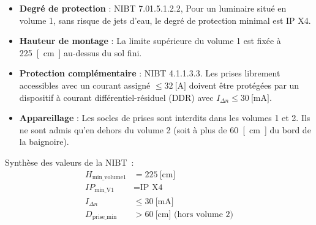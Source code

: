 \documentclass[a4paper,11pt,answers,addpoints]{exam}
\begin{document}
\begin{questions}
\begin{solution}
	\begin{itemize}
		\item \textbf{Degré de protection} : NIBT 7.01.5.1.2.2,  Pour un luminaire situé en volume \num{1}, sans risque de jets d'eau, le degré de protection minimal est IP X4.
		\item \textbf{Hauteur de montage} : La limite supérieure du volume \num{1} est fixée à \qty{225}{[\centi\metre]} au-dessus du sol fini.
		\item \textbf{Protection complémentaire} : NIBT 4.1.1.3.3. Les prises librement accessibles avec un courant assigné $\leq \qty{32}{[\ampere]}$ doivent être protégées par un dispositif à courant différentiel-résiduel (DDR) avec $I_{\Delta n} \leq \qty{30}{[\milli\ampere]}$.
		\item \textbf{Appareillage} : Les socles de prises sont interdits dans les volumes \num{1} et \num{2}. Ils ne sont admis qu'en dehors du volume \num{2} (soit à plus de \qty{60}{[\centi\metre]} du bord de la baignoire).
	\end{itemize}
	
	Synthèse des valeurs de la NIBT~:
	\begin{align*}
		H_{\text{min\_volume1}} &= \qty{225}{[\centi\metre]} \\[6pt]
		IP_{\text{min\_V1}} &= \text{IP X4} \\[6pt]
		I_{\Delta n} &\leq \qty{30}{[\milli\ampere]} \\[6pt]
		D_{\text{prise\_min}} &> \qty{60}{[\centi\metre]} \text{ (hors volume 2)}
	\end{align*}
\end{solution}
\end{questions}
\end{document}
